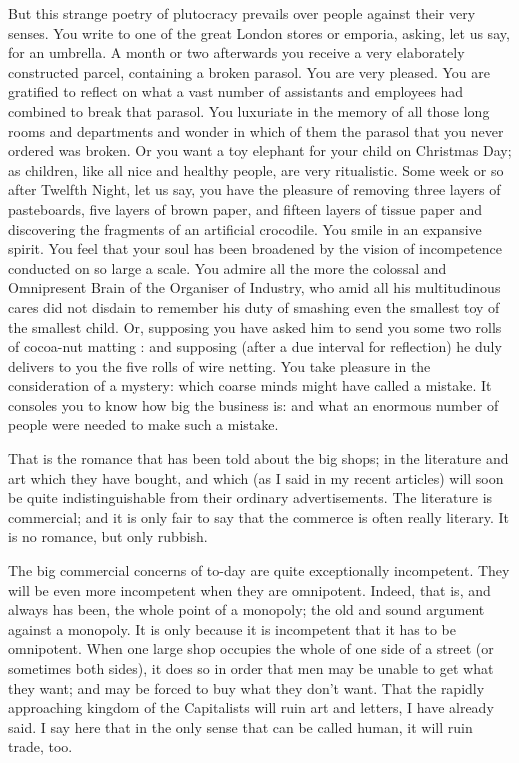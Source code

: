 \documentclass{book}
\begin{document}
But this strange poetry of plutocracy prevails over people against their very senses. You write to one of the great London stores or emporia, asking, let us say, for an umbrella. A month or two afterwards you receive a very elaborately constructed parcel, containing a broken parasol. You are very pleased. You are gratified to reflect on what a vast number of assistants and employees had combined to break that parasol. You luxuriate in the memory of all those long rooms and departments and wonder in which of them the parasol that you never ordered was broken. Or you want a toy elephant for your child on Christmas Day; as children, like all nice and healthy people, are very ritualistic. Some week or so after Twelfth Night, let us say, you have the pleasure of removing three layers of pasteboards, five layers of brown paper, and fifteen layers of tissue paper and discovering the fragments of an artificial crocodile. You smile in an expansive spirit. You feel that your soul has been broadened by the vision of incompetence conducted on so large a scale. You admire all the more the colossal and Omnipresent Brain of the Organiser of Industry, who amid all his multitudinous cares did not disdain to remember his duty of smashing even the smallest toy of the smallest child. Or, supposing you have asked him to send you some two rolls of cocoa-nut matting : and supposing (after a due interval for reflection) he duly delivers to you the five rolls of wire netting. You take pleasure in the consideration of a mystery: which coarse minds might have called a mistake. It consoles you to know how big the business is: and what an enormous number of people were needed to make such a mistake.

That is the romance that has been told about the big shops; in the literature and art which they have bought, and which (as I said in my recent articles) will soon be quite indistinguishable from their ordinary advertisements. The literature is commercial; and it is only fair to say that the commerce is often really literary. It is no romance, but only rubbish.

The big commercial concerns of to-day are quite exceptionally incompetent. They will be even more incompetent when they are omnipotent. Indeed, that is, and always has been, the whole point of a monopoly; the old and sound argument against a monopoly. It is only because it is incompetent that it has to be omnipotent. When one large shop occupies the whole of one side of a street (or sometimes both sides), it does so in order that men may be unable to get what they want; and may be forced to buy what they don’t want. That the rapidly approaching kingdom of the Capitalists will ruin art and letters, I have already said. I say here that in the only sense that can be called human, it will ruin trade, too.
\end{document}
